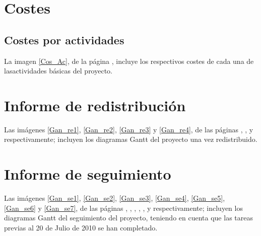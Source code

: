 \documentclass[11pt,a4paper,spanish,twoside]{book}
\begin{document}
\section{Costes}

\subsection{Costes por actividades}
La imagen \ref{Cos_Ac}, de la página \pageref{Cos_Ac}, incluye los
respectivos costes de cada una de lasactividades básicas del proyecto. 

\begin{sidewaystable}
\end{sidewaystable}

\section{Informe de redistribución}
Las imágenes \ref{Gan_re1}, \ref{Gan_re2}, \ref{Gan_re3} y \ref{Gan_re4}, de
las páginas \pageref{Gan_re1}, \pageref{Gan_re2}, \pageref{Gan_re3} y
\pageref{Gan_re4} respectivamente; incluyen los diagramas Gantt del proyecto
una vez redistribuido.

\begin{sidewaystable}
\end{sidewaystable}

\begin{sidewaystable}
\end{sidewaystable}

\begin{sidewaystable}
\end{sidewaystable}

\begin{sidewaystable}
\end{sidewaystable}

\section{Informe de seguimiento}
Las imágenes \ref{Gan_se1}, \ref{Gan_se2}, \ref{Gan_se3}, \ref{Gan_se4},
\ref{Gan_se5}, \ref{Gan_se6} y \ref{Gan_se7}, de las páginas
\pageref{Gan_se1}, \pageref{Gan_se2}, \pageref{Gan_se3}, \pageref{Gan_se4},
\pageref{Gan_se5}, \pageref{Gan_se6} y \pageref{Gan_se7} respectivamente;
incluyen los diagramas Gantt del seguimiento del proyecto, teniendo en cuenta
que las tareas previas al 20 de Julio de 2010 se han completado.
\end{document}
